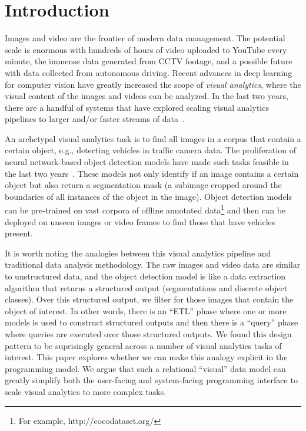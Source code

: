 \section{Introduction}\label{intro}\sloppy
Images and video are the frontier of modern data management.
The potential scale is enormous with hundreds of hours of video uploaded to YouTube every minute, the immense data generated from CCTV footage, and a possible future with data collected from autonomous driving. 
Recent advances in deep learning for computer vision have greatly increased the scope of \emph{visual analytics}, where the visual content of the images and videos can be analyzed.
In the last two years, there are a handful of systems that have explored scaling visual analytics pipelines to larger and/or faster streams of data~\cite{anderson2018predicate, kang2018blazeit,kang2017noscope, wu2018querying, sparks2017keystoneml}.

An archetypal visual analytics task is to find all images in a corpus that contain a certain object, e.g., detecting vehicles in traffic camera data.
The proliferation of neural network-based object detection models have made such tasks feasible in the last two years~\cite{he2017mask}.
These models not only identify if an image contains a certain object but also return a segmentation mask (a subimage cropped around the boundaries of all instances of the object in the image).
Object detection models can be pre-trained on vast corpora of offline annotated data\footnote{For example, http://cocodataset.org/} and then can be deployed on unseen images or video frames to find those that have vehicles present.

It is worth noting the analogies between this visual analytics pipeline and traditional data analysis methodology.
The raw images and video data are similar to unstructured data, and the object detection model is like a data extraction algorithm that returns a structured output (segmentations and discrete object classes).
Over this structured output, we filter for those images that contain the object of interest.
In other words, there is an ``ETL'' phase where one or more models is used to construct structured outputs and then there is a ``query'' phase where queries are executed over those structured outputs.
We found this design pattern to be suprisingly general across a number of visual analytics tasks of interest.
This paper explores whether we can make this analogy explicit in the programming model.
We argue that such a relational ``visual'' data model can greatly simplify both the user-facing and system-facing programming interface to scale visual analytics to more complex tasks.

